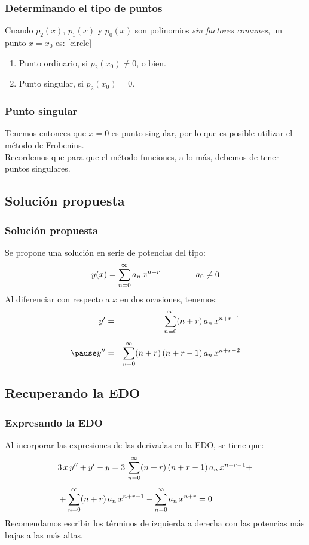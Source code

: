 \documentclass[12pt]{beamer}
\begin{document}
\begin{frame}
\frametitle{Determinando el tipo de puntos}
Cuando $p_{2}(x)$, $p_{1}(x)$ y $p_{0}(x)$ son polinomios \emph{sin factores comunes}, un punto $x = x_{0}$ es:
[circle]
\begin{enumerate}[<+->]
\item Punto ordinario, si $p_{2}(x_{0}) \neq 0$, o bien.
\item Punto singular,  si $p_{2}(x_{0}) = 0$.
\end{enumerate}
\end{frame}
\begin{frame}
\frametitle{Punto singular}
Tenemos entonces que $x = 0$ es punto singular, por lo que es posible utilizar el método de Frobenius.
\\
\bigskip
\pause
Recordemos que para que el método funciones, a lo más, debemos de tener puntos singulares.
\end{frame}

\subsection*{Solución propuesta}

\begin{frame}
\frametitle{Solución propuesta}
Se propone una solución en serie de potencias del tipo:
\begin{align*}
y(x) = \sum_{n=0}^{\infty} a_{n} \, x^{n+r} \hspace{1.5cm} a_{0} \neq 0
\end{align*}
\pause
Al diferenciar con respecto a $x$ en dos ocasiones, tenemos:
\begin{eqnarray*}
\ptilde{y} &=& \sum_{n=0}^{\infty} (n + r) \, a_{n} \, x^{n+r-1} \\[0.5em] \pause
\stilde{y} &=& \sum_{n=0}^{\infty} (n + r) \, (n + r - 1) \, a_{n} \, x^{n+r-2}
\end{eqnarray*}
\end{frame}

\subsection*{Recuperando la EDO}

\begin{frame}
\frametitle{Expresando la EDO}
Al incorporar las expresiones de las derivadas en la EDO, se tiene que:
\pause
\begin{align*}
&3 \, x \, {y}^{\prime \prime} + {y}^{\prime} - y = 3 \, \sum_{n=0}^{\infty} (n + r) \, (n + r - 1) \, a_{n} \, x^{n+r-1} + \\[0.5em]
&+ \sum_{n=0}^{\infty} (n + r) \, a_{n} \, x^{n+r-1} - \sum_{n=0}^{\infty} a_{n} \, x^{n+r} = 0
\end{align*}
\pause
Recomendamos escribir los términos de izquierda a derecha con las potencias más bajas a las más altas.
\end{frame}
\end{document}
